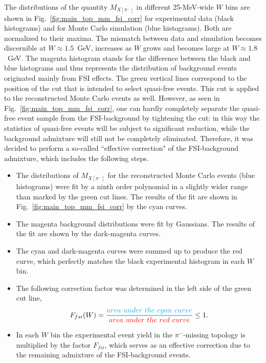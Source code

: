 The distributions of the quantity $M_{X[\pi^{-}]}$ in different 25-MeV-wide $W$ bins are shown in Fig.~\ref{fig:main_top_mm_fsi_corr} for experimental data (black histograms) and for Monte Carlo simulation (blue histograms). Both are normalized to their maxima. The mismatch between data and simulation becomes discernible at $W\approx 1.5$~GeV, increases as $W$ grows and becomes large at $W\approx 1.8$~GeV. The magenta histogram stands for the difference between the black and blue histograms and thus represents the distribution of background events originated mainly from FSI effects. The green vertical lines correspond to the position of the cut that is intended to select quasi-free events. This cut is applied to the reconstructed Monte Carlo events as well. However, as seen in Fig.~\ref{fig:main_top_mm_fsi_corr}, one can hardly completely separate the quasi-free event sample from the FSI-background by tightening the cut: in this way the statistics of quasi-free events will be subject to significant reduction, while the background admixture will still not be completely eliminated. Therefore, it was decided to perform a so-called ``effective correction" of the FSI-background admixture, which includes the following steps.

\begin{itemize}
\item The distributions of $M_{X[\pi^{-}]}$ for the reconstructed Monte Carlo events (blue histograms) were fit by a ninth order polynomial in a slightly wider range than marked by the green cut lines. The results of the fit are shown in Fig.~\ref{fig:main_top_mm_fsi_corr} by the cyan curves.
\item The magenta background distributions were fit by Gaussians. The results of the fit are shown by the dark-magenta curves.
\item The cyan and dark-magenta curves were summed up to produce the red curve, which perfectly matches the black experimental histogram in each $W$ bin.
\item The following correction factor was determined in the left side of the green cut line,
\begin{equation}
 F_{fsi}(W) = \frac{\color{cyan}{area~under~the~cyan~curve}}{\color{red}{area~under~the~red~curve}} \leq 1.\label{eq:fsi_corr_fact}
\end{equation}\label{eq:fsi_corr}\vspace{-1em}
\item In each $W$ bin the experimental event yield in the $\pi^{-}$-missing topology is multiplied by the factor $F_{fsi}$, which serves as an effective correction due to the remaining admixture of the FSI-background events.
\end{itemize}

